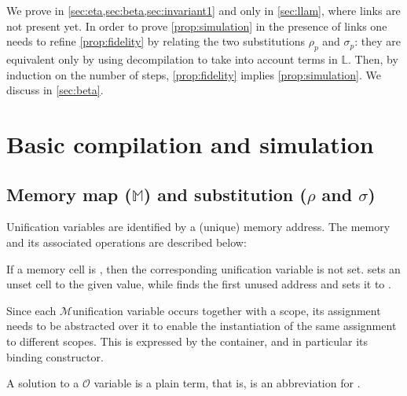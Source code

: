 \documentclass[sigconf,natbib=false,review]{acmart}
\newcommand{\Fo}{\texorpdfstring{\ensuremath{\mathcal{O}}\xspace}{O}}
\newcommand{\Ho}{\texorpdfstring{\ensuremath{\mathcal{M}}\xspace}{M}}
\newcommand{\linkStore}{\texorpdfstring{\ensuremath{\mathbb{L}}\xspace}{L}}
\newcommand{\mapStore}{\texorpdfstring{\ensuremath{\mathbb{M}}\xspace}{M}}
\begin{document}
We prove  in
\cref{sec:eta,sec:beta,sec:invariant1}
and  only in \cref{sec:llam},
where links are not present yet.
In order to prove \cref{prop:simulation} in the presence of links
one needs to refine \cref{prop:fidelity} by relating the two
substitutions $\rho_p$ and $\sigma_p$: they are equivalent only by using decompilation to 
take into account terms in \linkStore.
Then, by induction
on the number of steps, \cref{prop:fidelity} implies \cref{prop:simulation}.
We discuss  in \cref{sec:beta}.


\section{Basic compilation and simulation}
\label{sec:simulation}


\subsection{Memory map (\mapStore) and substitution (\texorpdfstring{$\rho$ and $\sigma$}{rho and sigma})}
\label{sec:grounwork}


% 

Unification variables are identified by a (unique) memory address.
The memory and its associated operations are described below:



\noindent
If a memory cell is , then the corresponding unification variable
is not set.  sets an unset cell to the given value, while
 finds the first unused address and sets it to .

Since each \Ho unification variable occurs together with a scope,
its assignment needs to be abstracted over it to enable the
instantiation of the same assignment to different scopes.
This is expressed by the  container, and in particular
its  binding constructor.



\noindent
A solution to a \Fo{} variable is a plain term, that is, 
is an abbreviation for .
\end{document}
